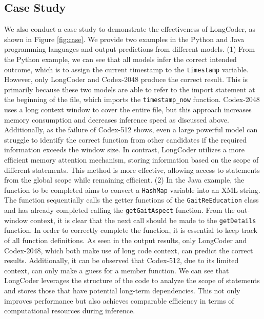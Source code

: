 \documentclass{article}
\begin{document}
\subsection{Case Study}
We also conduct a case study to demonstrate the effectiveness of LongCoder, as shown in Figure \ref{fig:case}. We provide two examples in the Python and Java programming languages and output predictions from different models. 
(1) From the Python example, we can see that all models infer the correct intended outcome, which is to assign the current timestamp to the \texttt{timestamp} variable. However, only LongCoder and Codex-2048 produce the correct result. This is primarily because these two models are able to refer to the import statement at the beginning of the file, which imports the \texttt{timestamp\_now} function. Codex-2048 uses a long context window to cover the entire file, but this approach increases memory consumption and decreases inference speed as discussed above. Additionally, as the failure of Codex-512 shows, even a large powerful model can struggle to identify the correct function from other candidates if the required information exceeds the window size. In contrast, LongCoder utilizes a more efficient memory attention mechanism, storing information based on the scope of different statements. This method is more effective, allowing access to statements from the global scope while remaining efficient.
(2) In the Java example, the function to be completed aims to convert a \texttt{HashMap} variable into an XML string. The function sequentially calls the getter functions of the \texttt{GaitReEducation} class and has already completed calling the \texttt{getGaitAspect} function. From the out-window context, it is clear that the next call should be made to the \texttt{getDetails} function. In order to correctly complete the function, it is essential to keep track of all function definitions. As seen in the output results, only LongCoder and Codex-2048, which both make use of long code context, can predict the correct results. Additionally, it can be observed that Codex-512, due to its limited context, can only make a guess for a member function. We can see that LongCoder leverages the structure of the code to analyze the scope of statements and stores those that have potential long-term dependencies. This not only improves performance but also achieves comparable efficiency in terms of computational resources during inference.
\end{document}
